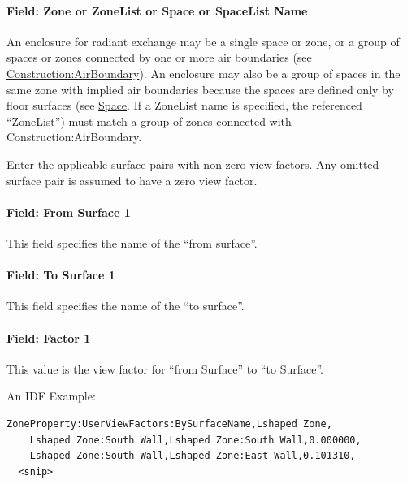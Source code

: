 \paragraph{Field: Zone or ZoneList or Space or SpaceList Name}\label{zonepropertyuserviewfactorsbysurfacename-field-zone-name}

An enclosure for radiant exchange may be a single space or zone, or a group of spaces or zones connected by one or more air boundaries (see \hyperref[constructionairboundary]{Construction:AirBoundary}).  An enclosure may also be a group of spaces in the same zone with implied air boundaries because the spaces are defined only by floor surfaces (see \hyperref[space]{Space}. 
If a ZoneList name is specified, the referenced ``\hyperref[zonelist]{ZoneList}'') must match a group of zones connected with Construction:AirBoundary.

Enter the applicable surface pairs with non-zero view factors. Any omitted surface pair is assumed to have a zero view factor.

\paragraph{Field: From Surface 1}\label{field-from-surface-1}

This field specifies the name of the ``from surface''.

\paragraph{Field: To Surface 1}\label{field-to-surface-1}

This field specifies the name of the ``to surface''.

\paragraph{Field: Factor 1}\label{field-factor-1}

This value is the view factor for ``from Surface'' to ``to Surface''.

An IDF Example:

\begin{lstlisting}
ZoneProperty:UserViewFactors:BySurfaceName,Lshaped Zone,
    Lshaped Zone:South Wall,Lshaped Zone:South Wall,0.000000,
    Lshaped Zone:South Wall,Lshaped Zone:East Wall,0.101310,
  <snip>
\end{lstlisting}
